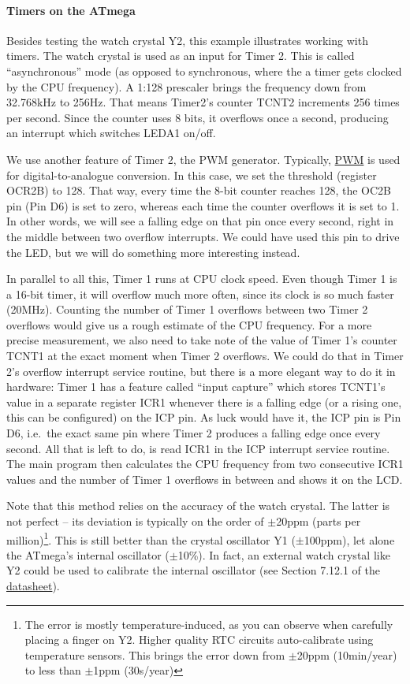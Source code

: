 \documentclass{article}
\newcommand{\datasheet}{\href{https://ww1.microchip.com/downloads/en/DeviceDoc/doc2593.pdf}{datasheet}}
\begin{document}
\paragraph{Timers on the ATmega}
Besides testing the watch crystal Y2, this example illustrates working with timers. 
The watch crystal is used as an input for Timer 2. This is called ``asynchronous'' mode (as opposed to synchronous, where the a timer gets clocked by the CPU frequency). A 1:128 prescaler brings the frequency down from 32.768kHz to 256Hz. That means Timer2's counter TCNT2 increments 256 times per second. Since the counter uses 8 bits, it overflows once a second, producing an interrupt which switches LEDA1 on/off. 

We use another feature of Timer 2, the PWM generator. Typically, \href{https://en.wikipedia.org/wiki/Pulse-width_modulation}{PWM} is used for digital-to-analogue conversion. In this case, we set the threshold (register OCR2B) to 128. That way, every time the 8-bit counter reaches 128, the OC2B pin (Pin D6) is set to zero, whereas each time the counter overflows it is set to 1. In other words, we will see a falling edge on that pin once every second, right in the middle between two overflow interrupts. We could have used this pin to drive the LED, but we will do something more interesting instead. 

In parallel to all this, Timer 1 runs at CPU clock speed. Even though Timer 1 is a 16-bit timer, it will overflow much more often, since its clock is so much faster (20MHz). Counting the number of Timer 1 overflows between two Timer 2 overflows would give us a rough estimate of the CPU frequency. For a more precise measurement, we also need to take note of the value of Timer 1's counter TCNT1 at the exact moment when Timer 2 overflows. We could do that in Timer 2's overflow interrupt service routine, but there is a more elegant way to do it in hardware: Timer 1 has a feature called ``input capture'' which stores TCNT1's value in a separate register ICR1 whenever there is a falling edge (or a rising one, this can be configured) on the ICP pin. As luck would have it, the ICP pin is Pin D6, i.e.\ the exact same pin where Timer 2 produces a falling edge once every second. All that is left to do, is read ICR1 in the ICP interrupt service routine. The main program then calculates the CPU frequency from two consecutive ICR1 values and the number of Timer 1 overflows in between and shows it on the LCD. 

Note that this method relies on the accuracy of the watch crystal. The latter is not perfect -- its deviation is typically on the order of $\pm$20ppm (parts per million)\footnote{The error is mostly temperature-induced, as you can observe when carefully placing a finger on Y2. Higher quality RTC circuits auto-calibrate using temperature sensors. This brings the error down from $\pm$20ppm (10min/year) to less than $\pm$1ppm (30s/year)}. This is still better than the crystal oscillator Y1 ($\pm$100ppm), let alone the ATmega's internal oscillator ($\pm$10\%). In fact, an external watch crystal like Y2 could be used to calibrate the internal oscillator (see Section 7.12.1 of the \datasheet). 
\end{document}

